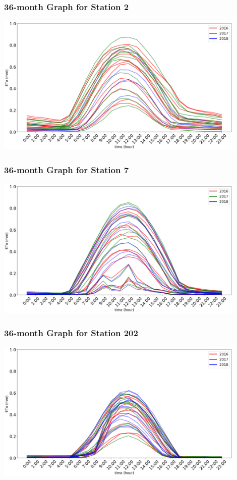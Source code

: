 \begin{frame}
\frametitle{36-month Graph for Station 2}
\centering
\includegraphics[width=0.9\textwidth]{images/234multi.png}
\end{frame}

\begin{frame}
\frametitle{36-month Graph for Station 7}
\centering
\includegraphics[width=0.9\textwidth]{images/7multi.png}
\end{frame}

\begin{frame}
\frametitle{36-month Graph for Station 202}
\centering
\includegraphics[width=0.9\textwidth]{images/202multi.png}
\end{frame}


